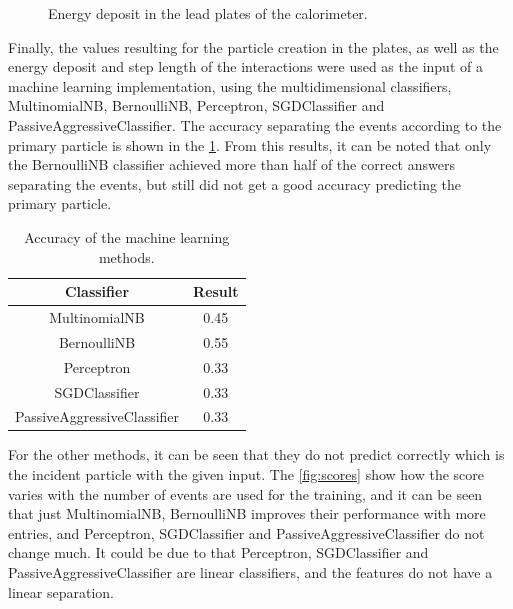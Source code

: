 \begin{figure}[htb!]
  \caption{Energy deposit in the lead plates of the calorimeter.}\label{fig:step-lengt-lead}

\end{figure}

Finally, the values resulting for the particle creation in the plates, as well
as the energy deposit and step length of the interactions were used as the
input of a machine learning implementation, using the multidimensional
classifiers, MultinomialNB, BernoulliNB, Perceptron, SGDClassifier and
PassiveAggressiveClassifier. The accuracy separating the events according to
the primary particle is shown in the \cref{tb:machine-learning-results}. From
this results, it can be noted that only the BernoulliNB classifier achieved
more than half of the correct answers separating the events, but still did not
get a good accuracy predicting the primary particle.

\begin{table}[hbt]
  \centering
  \begin{tabular}{c c}
    \textbf{Classifier} & \textbf{Result}\\
    \toprule
    MultinomialNB & 0.45\\
    \midrule
    BernoulliNB & 0.55\\
    \midrule
    Perceptron & 0.33\\
    \midrule
    SGDClassifier & 0.33\\
    \midrule
    PassiveAggressiveClassifier & 0.33\\
    \bottomrule
  \end{tabular}
  \caption{Accuracy of the machine learning methods.}\label{tb:machine-learning-results}
\end{table}

For the other methods, it can be seen that they do not predict correctly which
is the incident particle with the given input. The \cref{fig:scores} show how
the score varies with the number of events are used for the training, and it
can be seen that just MultinomialNB, BernoulliNB improves their performance
with more entries, and Perceptron, SGDClassifier and
PassiveAggressiveClassifier do not change much. It could be due to that
Perceptron, SGDClassifier and PassiveAggressiveClassifier are linear
classifiers, and the features do not have a linear separation.

